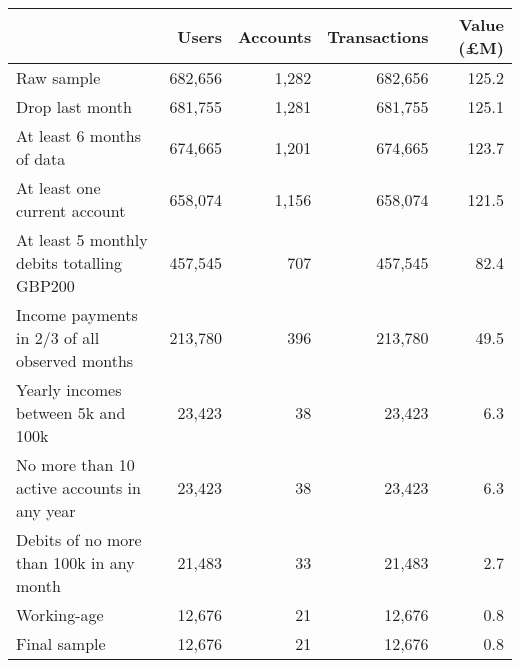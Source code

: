 \begin{tabular}{lrrrr}
\toprule
                                              &   Users & Accounts & Transactions & Value (\pounds M) \\
\midrule
                                   Raw sample & 682,656 &    1,282 &      682,656 &             125.2 \\
                              Drop last month & 681,755 &    1,281 &      681,755 &             125.1 \\
                    At least 6 months of data & 674,665 &    1,201 &      674,665 &             123.7 \\
                 At least one current account & 658,074 &    1,156 &      658,074 &             121.5 \\
   At least 5 monthly debits totalling GBP200 & 457,545 &      707 &      457,545 &              82.4 \\
Income payments in 2/3 of all observed months & 213,780 &      396 &      213,780 &              49.5 \\
           Yearly incomes between 5k and 100k &  23,423 &       38 &       23,423 &               6.3 \\
  No more than 10 active accounts in any year &  23,423 &       38 &       23,423 &               6.3 \\
     Debits of no more than 100k in any month &  21,483 &       33 &       21,483 &               2.7 \\
                                  Working-age &  12,676 &       21 &       12,676 &               0.8 \\
                                 Final sample &  12,676 &       21 &       12,676 &               0.8 \\
\bottomrule
\end{tabular}
